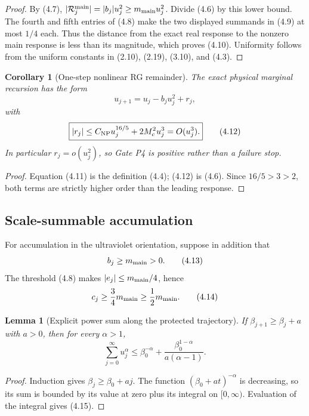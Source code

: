 \documentclass[11pt]{article}
\newtheorem{lemma}[theorem]{Lemma}
\newtheorem{corollary}[theorem]{Corollary}
\theoremstyle{definition}
\theoremstyle{remark}
\newcommand{\cR}{\mathcal R}
\begin{document}
\begin{proof}
By (4.7),
$|\cR_j^{\rm main}|=|b_j|u_j^2\ge m_{\rm main}u_j^2$.
Divide (4.6) by this lower bound.  The fourth and fifth entries of (4.8)
make the two displayed summands in (4.9) at most $1/4$ each.
Thus the distance from the exact real response to the nonzero main response
is less than its magnitude, which proves (4.10).  Uniformity follows from the
uniform constants in (2.10), (2.19), (3.10), and (4.3).
\end{proof}

\begin{corollary}[One-step nonlinear RG remainder]
\label{cor:one-step}
The exact physical marginal recursion has the form
\[
 u_{j+1}=u_j-b_ju_j^2+r_j,                                   \tag{4.11}
\]
with
\[
 \boxed{|r_j|\le C_{\rm NP}u_j^{16/5}+2M_c^2u_j^3
 =O(u_j^3).}                                                 \tag{4.12}
\]
In particular $r_j=o(u_j^2)$, so Gate P4 is positive rather than a failure
stop.
\end{corollary}

\begin{proof}
Equation (4.11) is the definition (4.4); (4.12) is (4.6).
Since $16/5>3>2$, both terms are strictly higher order than the leading
response.
\end{proof}

\subsection{Scale-summable accumulation}

For accumulation in the ultraviolet orientation, suppose in addition that
\[
 b_j\ge m_{\rm main}>0.                                    \tag{4.13}
\]
The threshold (4.8) makes
$|e_j|\le m_{\rm main}/4$, hence
\[
 c_j\ge\frac34m_{\rm main}\ge\frac12m_{\rm main}.       \tag{4.14}
\]

\begin{lemma}[Explicit power sum along the protected trajectory]
\label{lem:power-sum}
If $\beta_{j+1}\ge\beta_j+a$ with $a>0$, then for every $\alpha>1$,
\[
 \sum_{j=0}^\infty u_j^\alpha
 \le \beta_0^{-\alpha}
 +\frac{\beta_0^{1-\alpha}}{a(\alpha-1)}.                \tag{4.15}
\]
\end{lemma}

\begin{proof}
Induction gives $\beta_j\ge\beta_0+aj$.  The function
$(\beta_0+at)^{-\alpha}$ is decreasing, so its sum is bounded by its
value at zero plus its integral on $[0,\infty)$.  Evaluation of the
integral gives (4.15).
\end{proof}
\end{document}
